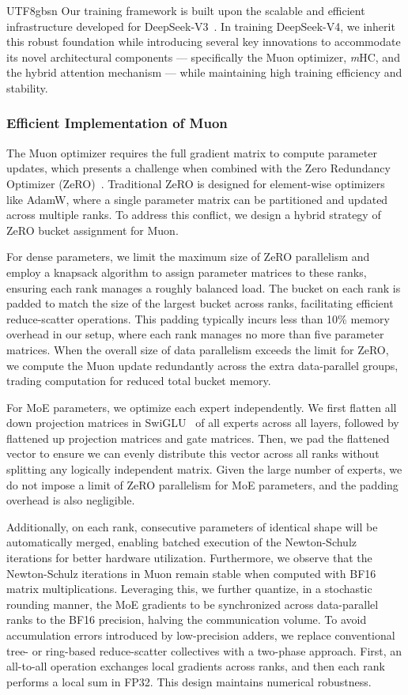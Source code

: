 \documentclass[11pt, a4paper, logo, copyright, nonumbering]{deepseek}
\newcommand{\dsviii}{DeepSeek-V3}
\newcommand{\dsviv}{DeepSeek-V4}
\newcommand{\mhc}{\textit{m}HC}
\begin{document}
\begin{CJK*}{UTF8}{gbsn}
Our training framework is built upon the scalable and efficient infrastructure developed for \dsviii{}~\citep{dsv3}.
In training \dsviv{}, we inherit this robust foundation while introducing several key innovations to accommodate its novel architectural components --- specifically the Muon optimizer, \mhc{}, and the hybrid attention mechanism --- while maintaining high training efficiency and stability.

\subsubsection{Efficient Implementation of Muon}
The Muon optimizer requires the full gradient matrix to compute parameter updates, which presents a challenge when combined with the Zero Redundancy Optimizer (ZeRO)~\citep{zero}. 
Traditional ZeRO is designed for element-wise optimizers like AdamW, where a single parameter matrix can be partitioned and updated across multiple ranks. 
To address this conflict, we design a hybrid strategy of ZeRO bucket assignment for Muon. 

For dense parameters, we limit the maximum size of ZeRO parallelism and employ a knapsack algorithm to assign parameter matrices to these ranks, ensuring each rank manages a roughly balanced load.
The bucket on each rank is padded to match the size of the largest bucket across ranks, facilitating efficient reduce-scatter operations.
This padding typically incurs less than 10\% memory overhead in our setup, where each rank manages no more than five parameter matrices. 
When the overall size of data parallelism exceeds the limit for ZeRO, we compute the Muon update redundantly across the extra data-parallel groups, trading computation for reduced total bucket memory.

For MoE parameters, we optimize each expert independently. 
We first flatten all down projection matrices in SwiGLU~\citep{shazeer2020glu} of all experts across all layers, followed by flattened up projection matrices and gate matrices. 
Then, we pad the flattened vector to ensure we can evenly distribute this vector across all ranks without splitting any logically independent matrix. 
Given the large number of experts, we do not impose a limit of ZeRO parallelism for MoE parameters, and the padding overhead is also negligible.

Additionally, on each rank, consecutive parameters of identical shape will be automatically merged, enabling batched execution of the Newton-Schulz iterations for better hardware utilization.
Furthermore, we observe that the Newton-Schulz iterations in Muon remain stable when computed with BF16 matrix multiplications. 
Leveraging this, we further quantize, in a stochastic rounding manner, the MoE gradients to be synchronized across data-parallel ranks to the BF16 precision, halving the communication volume. 
To avoid accumulation errors introduced by low-precision adders, we replace conventional tree- or ring-based reduce-scatter collectives with a two-phase approach. 
First, an all-to-all operation exchanges local gradients across ranks, and then each rank performs a local sum in FP32. This design maintains numerical robustness.


\end{CJK*}
\end{document}

